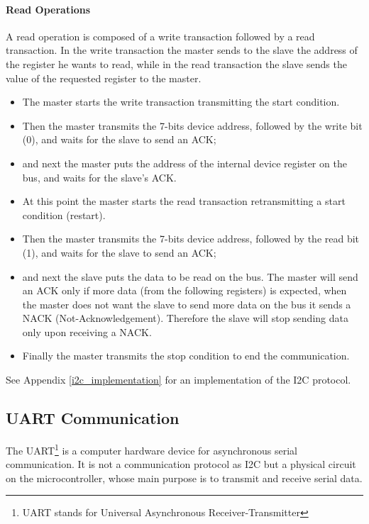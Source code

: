 \paragraph{Read Operations}
A read operation is composed of a write transaction followed by a read transaction. In the write transaction the master sends to the slave the address of the register he wants to read, while in the read transaction the slave sends the value of the requested register to the master.
\begin{itemize}
	\item[1. ] The master starts the write transaction transmitting the start condition.
	\item[2. ] Then the master transmits the 7-bits device address, followed by the write bit (0), and waits for the slave to send an ACK;
	\item[3. ] and next the master puts the address of the internal device register on the bus, and waits for the slave's ACK.
	\item[4. ] At this point the master starts the read transaction retransmitting a start condition (restart).
	\item[5. ] Then the master transmits the 7-bits device address, followed by the read bit (1), and waits for the slave to send an ACK;
	\item[6. ] and next the slave puts the data to be read on the bus. The master will send an ACK only if more data (from the following registers) is expected, when the master does not want the slave to send more data on the bus it sends a NACK (Not-Acknowledgement). Therefore the slave will stop sending data only upon receiving a NACK.
	\item[7. ] Finally the master transmits the stop condition to end the communication.
\end{itemize}
See Appendix \ref{i2c_implementation} for an implementation of the I2C protocol.\\


\subsection{UART Communication}

The UART\footnote{UART stands for Universal Asynchronous Receiver-Transmitter} is a computer hardware device for asynchronous serial communication. It is not a communication protocol as I2C but a physical circuit on the microcontroller, whose main purpose is to transmit and receive serial data.\\

